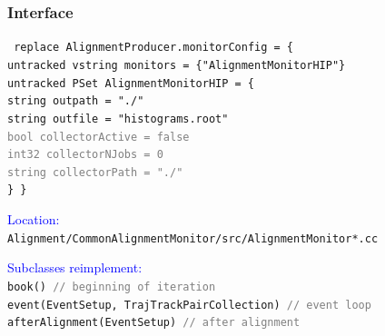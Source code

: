 \documentclass[compress]{beamer}
\begin{document}
\begin{frame}
\frametitle{Interface}

{\tt \small
replace AlignmentProducer.monitorConfig = \{ \\
\mbox{\hspace{0.5 cm}}untracked vstring monitors = \{"AlignmentMonitorHIP"\} \\
\mbox{\hspace{0.5 cm}}untracked PSet AlignmentMonitorHIP = \{ \\
\mbox{\hspace{0.5 cm}}\mbox{\hspace{0.5 cm}}string outpath = "./" \\
\mbox{\hspace{0.5 cm}}\mbox{\hspace{0.5 cm}}string outfile = "histograms.root" \\
\mbox{\hspace{0.5 cm}}\mbox{\hspace{0.5 cm}}\textcolor{gray}{bool collectorActive = false} \\
\mbox{\hspace{0.5 cm}}\mbox{\hspace{0.5 cm}}\textcolor{gray}{int32 collectorNJobs = 0} \\
\mbox{\hspace{0.5 cm}}\mbox{\hspace{0.5 cm}}\textcolor{gray}{string collectorPath = "./"} \\
\mbox{\hspace{0.5 cm}}\} \}}

\vfill
\hspace{-0.75 cm} \textcolor{blue}{Location:} \\
{\tt \small Alignment/CommonAlignmentMonitor/src/AlignmentMonitor*.cc}

\vfill
\hspace{-0.75 cm} \textcolor{blue}{Subclasses reimplement:} \\
{\tt \small book() \hfill \textcolor{gray}{// beginning of iteration} \\
event(EventSetup, TrajTrackPairCollection) \hfill \textcolor{gray}{// event loop} \\
afterAlignment(EventSetup) \hfill \textcolor{gray}{// after alignment}}
\end{frame}
\end{document}
